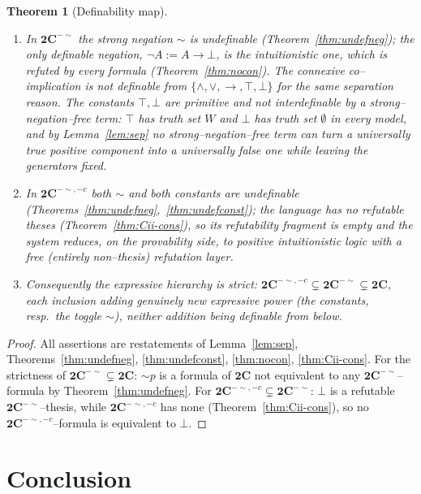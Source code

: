 \documentclass{amsart}
\theoremstyle{plain}
\newtheorem{theorem}{Theorem}
\theoremstyle{definition}
\newcommand{\To}{\rightarrow}
\newcommand{\bigC}{\mathbf{2C}}
\newcommand{\Ci}{\mathbf{2C}^{-{\sim}}}        %
\newcommand{\Cii}{\mathbf{2C}^{-{\sim},-c}}    %
\begin{document}
\begin{theorem}[Definability map]\label{thm:expr}
\begin{enumerate}
\item In $\Ci$ the strong negation ${\sim}$ is undefinable
(Theorem~\ref{thm:undefneg}); the only definable negation, $\neg A:=A\To\bot$, is
the intuitionistic one, which is refuted by every formula
(Theorem~\ref{thm:nocon}). The connexive co--implication is not definable from
$\{\wedge,\vee,\To,\top,\bot\}$ for the same separation reason. The constants
$\top,\bot$ are primitive and not interdefinable by a strong--negation--free
term: $\top$ has truth set $W$ and $\bot$ has truth set $\emptyset$ in every
model, and by Lemma~\ref{lem:sep} no strong--negation--free term can turn a
universally true positive component into a universally false one while leaving
the generators fixed.
\item In $\Cii$ both ${\sim}$ and both constants are undefinable
(Theorems~\ref{thm:undefneg},~\ref{thm:undefconst}); the language has \emph{no}
refutable theses (Theorem~\ref{thm:Cii-cons}), so its refutability fragment is
empty and the system reduces, on the provability side, to positive intuitionistic
logic with a free (entirely non--thesis) refutation layer.
\item Consequently the expressive hierarchy is strict:
$\Cii\subsetneq\Ci\subsetneq\bigC$, each inclusion adding genuinely new
expressive power (the constants, resp.\ the toggle ${\sim}$), neither addition
being definable from below.
\end{enumerate}
\end{theorem}
\begin{proof}
All assertions are restatements of Lemma~\ref{lem:sep},
Theorems~\ref{thm:undefneg}, \ref{thm:undefconst}, \ref{thm:nocon},
\ref{thm:Cii-cons}. For the strictness of $\Ci\subsetneq\bigC$: ${\sim}p$ is a
formula of $\bigC$ not equivalent to any $\Ci$--formula by
Theorem~\ref{thm:undefneg}. For $\Cii\subsetneq\Ci$: $\bot$ is a refutable
$\Ci$--thesis, while $\Cii$ has none (Theorem~\ref{thm:Cii-cons}), so no
$\Cii$--formula is equivalent to $\bot$.
\end{proof}

\section{Conclusion}
\end{document}
